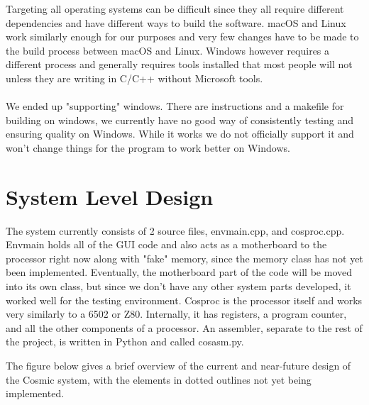 \documentclass[conference]{IEEEtran}
\begin{document}
Targeting all operating systems can be difficult since they all require different dependencies and have different ways to build the software. macOS and Linux work similarly enough for our purposes and very few changes have to be made to the build process between macOS and Linux. Windows however requires a different process and generally requires tools installed that most people will not unless they are writing in C/C++ without Microsoft tools. \\

\\

We ended up "supporting" windows. There are instructions and a makefile for building on windows, we currently have no good way of consistently testing and ensuring quality on Windows. While it works we do not officially support it and won't change things for the program to work better on Windows. 


\section{System Level Design}

The system currently consists of 2 source files, envmain.cpp, and cosproc.cpp. Envmain holds all of the GUI code and also acts as a motherboard to the processor right now along with "fake" memory, since the memory class has not yet been implemented. Eventually, the motherboard part of the code will be moved into its own class, but since we don't have any other system parts developed, it worked well for the testing environment. Cosproc is the processor itself and works very similarly to a 6502 or Z80. Internally, it has registers, a program counter, and all the other components of a processor. An assembler, separate to the rest of the project, is written in Python and called cosasm.py. 

The figure below gives a brief overview of the current and near-future design of the Cosmic system, with the elements in dotted outlines not yet being implemented.
\end{document}
